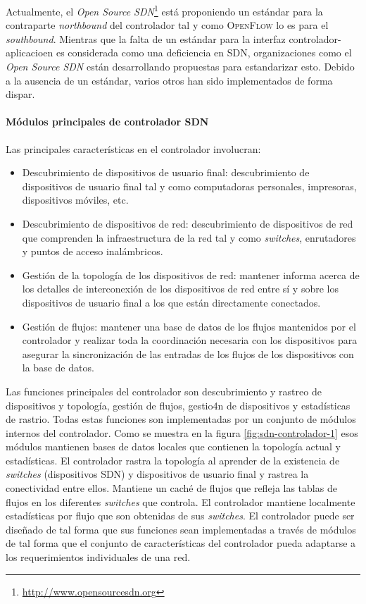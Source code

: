 \documentclass[10pt,journal,compsoc]{IEEEtran}
\begin{document}
Actualmente, el \emph{Open Source SDN}\footnote{\url{http://www.opensourcesdn.org}} está proponiendo un estándar para la contraparte \emph{northbound} del controlador tal y como \textsc{OpenFlow} lo es para el \emph{southbound}. Mientras que la falta de un estándar para la interfaz controlador-aplicacioen es considerada como una deficiencia en SDN, organizaciones como el \emph{Open Source SDN} están desarrollando propuestas para estandarizar esto. Debido a la ausencia de un estándar, varios otros han sido implementados de forma dispar.

\paragraph{Módulos principales de controlador SDN}
Las principales características en el controlador involucran:
\begin{itemize}
    \item Descubrimiento de dispositivos de usuario final: descubrimiento de dispositivos de usuario final tal y como computadoras personales, impresoras, dispositivos móviles, etc.
    \item Descubrimiento de dispositivos de red: descubrimiento de dispositivos de red que comprenden la infraestructura de la red tal y como \emph{switches}, enrutadores y puntos de acceso inalámbricos.
    \item Gestión de la topología de los dispositivos de red: mantener informa acerca de los detalles de interconexión de los dispositivos de red entre sí y sobre los dispositivos de usuario final a los que están directamente conectados.
    \item Gestión de flujos: mantener una base de datos de los flujos mantenidos por el controlador y realizar toda la coordinación necesaria con los dispositivos para asegurar la sincronización de las entradas de los flujos de los dispositivos con la base de datos.
\end{itemize}

Las funciones principales del controlador son descubrimiento y rastreo de dispositivos y topología, gestión de flujos, gestio4n de dispositivos y estadísticas de rastrio. Todas estas funciones son implementadas por un conjunto de módulos internos del controlador. Como se muestra en la figura \ref{fig:sdn-controlador-1} esos módulos mantienen bases de datos locales que contienen la topología actual y estadísticas. El controlador rastra la topología al aprender de la existencia de \emph{switches} (dispositivos SDN) y dispositivos de usuario final y rastrea la conectividad entre ellos. Mantiene un caché de flujos que refleja las tablas de flujos en los diferentes \emph{switches} que controla. El controlador mantiene localmente estadísticas por flujo que son obtenidas de sus \emph{switches}. El controlador puede ser diseñado de tal forma que sus funciones sean implementadas a través de módulos de tal forma que el conjunto de características del controlador pueda adaptarse a los requerimientos individuales de una red.
\end{document}
